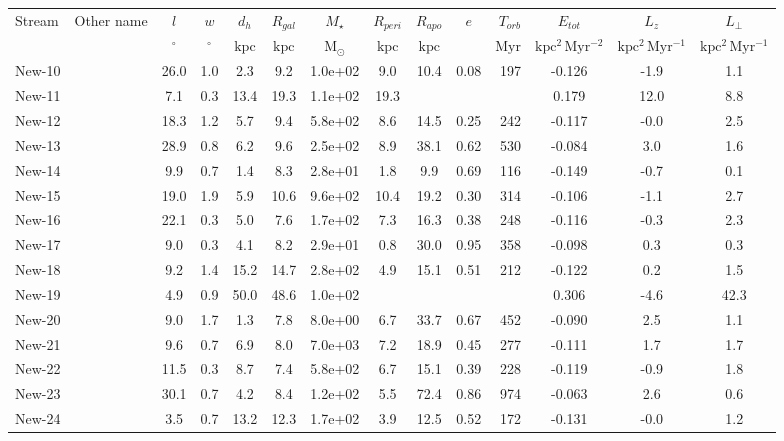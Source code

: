 \centering
\begin{tabular}{llSSSSSSSSrSSS}
\hline\hline
Stream & Other name & $l$ & $w$ & {$d_{h}$} & $R_{gal}$ & $M_\star$ & $R_{peri}$ & $R_{apo}$ & {$e$} & {$T_{orb}$} & {$E_{tot}$} & $L_z$ & $L_\perp$ \\
 &  & $\mathrm{{}^{\circ}}$ & $\mathrm{{}^{\circ}}$ & $\mathrm{kpc}$ & $\mathrm{kpc}$ & $\mathrm{M_{\odot}}$ & $\mathrm{kpc}$ & $\mathrm{kpc}$ &  & $\mathrm{Myr}$ & $\mathrm{kpc^{2}\,Myr^{-2}}$ & $\mathrm{kpc^{2}\,Myr^{-1}}$ & $\mathrm{kpc^{2}\,Myr^{-1}}$ \\
\hline
New-10 &  & 26.0 & 1.0 & 2.3 & 9.2 & 1.0e+02 & 9.0 & 10.4 & 0.08 & 197 & -0.126 & -1.9 & 1.1 \\
New-11 &  & 7.1 & 0.3 & 13.4 & 19.3 & 1.1e+02 & 19.3 &  &  &  & 0.179 & 12.0 & 8.8 \\
New-12 &  & 18.3 & 1.2 & 5.7 & 9.4 & 5.8e+02 & 8.6 & 14.5 & 0.25 & 242 & -0.117 & -0.0 & 2.5 \\
New-13 &  & 28.9 & 0.8 & 6.2 & 9.6 & 2.5e+02 & 8.9 & 38.1 & 0.62 & 530 & -0.084 & 3.0 & 1.6 \\
New-14 &  & 9.9 & 0.7 & 1.4 & 8.3 & 2.8e+01 & 1.8 & 9.9 & 0.69 & 116 & -0.149 & -0.7 & 0.1 \\
New-15 &  & 19.0 & 1.9 & 5.9 & 10.6 & 9.6e+02 & 10.4 & 19.2 & 0.30 & 314 & -0.106 & -1.1 & 2.7 \\
New-16 &  & 22.1 & 0.3 & 5.0 & 7.6 & 1.7e+02 & 7.3 & 16.3 & 0.38 & 248 & -0.116 & -0.3 & 2.3 \\
New-17 &  & 9.0 & 0.3 & 4.1 & 8.2 & 2.9e+01 & 0.8 & 30.0 & 0.95 & 358 & -0.098 & 0.3 & 0.3 \\
New-18 &  & 9.2 & 1.4 & 15.2 & 14.7 & 2.8e+02 & 4.9 & 15.1 & 0.51 & 212 & -0.122 & 0.2 & 1.5 \\
New-19 &  & 4.9 & 0.9 & 50.0 & 48.6 & 1.0e+02 &  &  &  &  & 0.306 & -4.6 & 42.3 \\
New-20 &  & 9.0 & 1.7 & 1.3 & 7.8 & 8.0e+00 & 6.7 & 33.7 & 0.67 & 452 & -0.090 & 2.5 & 1.1 \\
New-21 &  & 9.6 & 0.7 & 6.9 & 8.0 & 7.0e+03 & 7.2 & 18.9 & 0.45 & 277 & -0.111 & 1.7 & 1.7 \\
New-22 &  & 11.5 & 0.3 & 8.7 & 7.4 & 5.8e+02 & 6.7 & 15.1 & 0.39 & 228 & -0.119 & -0.9 & 1.8 \\
New-23 &  & 30.1 & 0.7 & 4.2 & 8.4 & 1.2e+02 & 5.5 & 72.4 & 0.86 & 974 & -0.063 & 2.6 & 0.6 \\
New-24 &  & 3.5 & 0.7 & 13.2 & 12.3 & 1.7e+02 & 3.9 & 12.5 & 0.52 & 172 & -0.131 & -0.0 & 1.2 \\

\end{tabular}
